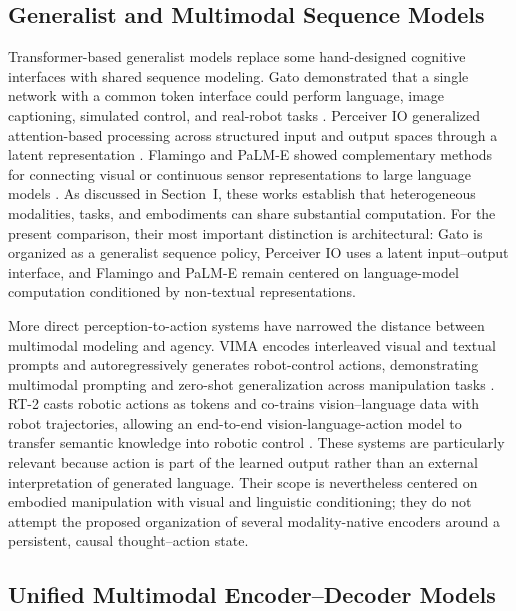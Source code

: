 \subsection{\textbf{Generalist and Multimodal Sequence Models}}

Transformer-based generalist models replace some hand-designed cognitive interfaces with shared sequence modeling. Gato demonstrated that a single network with a common token interface could perform language, image captioning, simulated control, and real-robot tasks \cite{reed2022generalist}. Perceiver IO generalized attention-based processing across structured input and output spaces through a latent representation \cite{jaegle2022perceiver}. Flamingo and PaLM-E showed complementary methods for connecting visual or continuous sensor representations to large language models \cite{alayrac2022flamingo,driess2023palme}. As discussed in Section~I, these works establish that heterogeneous modalities, tasks, and embodiments can share substantial computation. For the present comparison, their most important distinction is architectural: Gato is organized as a generalist sequence policy, Perceiver IO uses a latent input--output interface, and Flamingo and PaLM-E remain centered on language-model computation conditioned by non-textual representations.

More direct perception-to-action systems have narrowed the distance between multimodal modeling and agency. VIMA encodes interleaved visual and textual prompts and autoregressively generates robot-control actions, demonstrating multimodal prompting and zero-shot generalization across manipulation tasks \cite{jiang2023vima}. RT-2 casts robotic actions as tokens and co-trains vision--language data with robot trajectories, allowing an end-to-end vision-language-action model to transfer semantic knowledge into robotic control \cite{zitkovich2023rt2}. These systems are particularly relevant because action is part of the learned output rather than an external interpretation of generated language. Their scope is nevertheless centered on embodied manipulation with visual and linguistic conditioning; they do not attempt the proposed organization of several modality-native encoders around a persistent, causal thought--action state.

\subsection{\textbf{Unified Multimodal Encoder--Decoder Models}}

